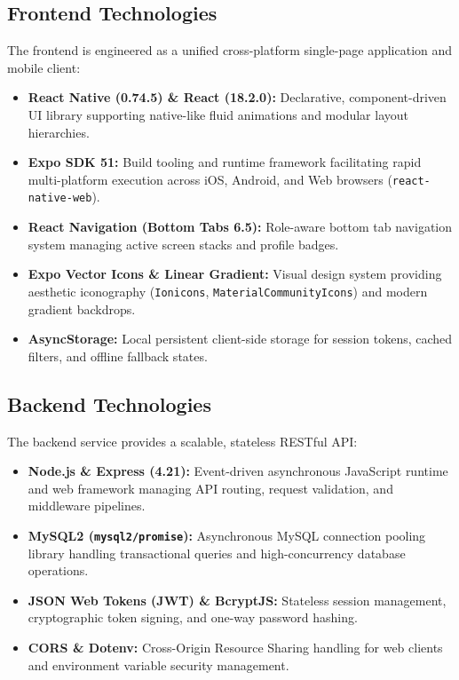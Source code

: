 \documentclass[12pt,a4paper]{article}
\begin{document}
\subsection{Frontend Technologies}
The frontend is engineered as a unified cross-platform single-page application and mobile client:
\begin{itemize}
    \item \textbf{React Native (0.74.5) \& React (18.2.0):} Declarative, component-driven UI library supporting native-like fluid animations and modular layout hierarchies.
    \item \textbf{Expo SDK 51:} Build tooling and runtime framework facilitating rapid multi-platform execution across iOS, Android, and Web browsers (\texttt{react-native-web}).
    \item \textbf{React Navigation (Bottom Tabs 6.5):} Role-aware bottom tab navigation system managing active screen stacks and profile badges.
    \item \textbf{Expo Vector Icons \& Linear Gradient:} Visual design system providing aesthetic iconography (\texttt{Ionicons}, \texttt{MaterialCommunityIcons}) and modern gradient backdrops.
    \item \textbf{AsyncStorage:} Local persistent client-side storage for session tokens, cached filters, and offline fallback states.
\end{itemize}

\subsection{Backend Technologies}
The backend service provides a scalable, stateless RESTful API:
\begin{itemize}
    \item \textbf{Node.js \& Express (4.21):} Event-driven asynchronous JavaScript runtime and web framework managing API routing, request validation, and middleware pipelines.
    \item \textbf{MySQL2 (\texttt{mysql2/promise}):} Asynchronous MySQL connection pooling library handling transactional queries and high-concurrency database operations.
    \item \textbf{JSON Web Tokens (JWT) \& BcryptJS:} Stateless session management, cryptographic token signing, and one-way password hashing.
    \item \textbf{CORS \& Dotenv:} Cross-Origin Resource Sharing handling for web clients and environment variable security management.
\end{itemize}
\end{document}

